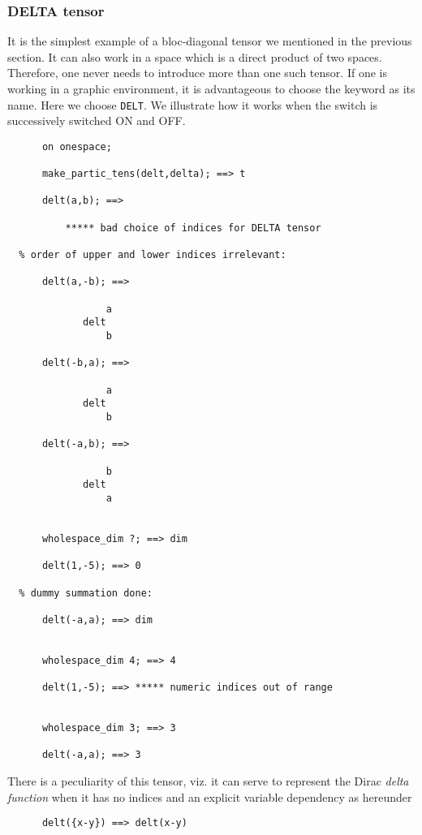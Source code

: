 \subsubsection{ DELTA tensor}
It is the simplest example of a bloc-diagonal
tensor we mentioned in the
previous section. It can also work in a space which is a direct product
of two spaces. Therefore, one never needs to introduce more than one 
such tensor. If one is working in a graphic environment, it is advantageous 
to choose the keyword as its name. Here we choose \texttt{DELT}.
We illustrate how it works  when the switch  is 
successively switched ON and OFF.
\begin{verbatim}
      on onespace;

      make_partic_tens(delt,delta); ==> t

      delt(a,b); ==> 

          ***** bad choice of indices for DELTA tensor

  % order of upper and lower indices irrelevant:    

      delt(a,-b); ==>

                 a
             delt
                 b

      delt(-b,a); ==>

                 a
             delt
                 b
     
      delt(-a,b); ==>

                 b
             delt
                 a


      wholespace_dim ?; ==> dim

      delt(1,-5); ==> 0

  % dummy summation done:   

      delt(-a,a); ==> dim


      wholespace_dim 4; ==> 4

      delt(1,-5); ==> ***** numeric indices out of range


      wholespace_dim 3; ==> 3

      delt(-a,a); ==> 3
\end{verbatim}
There is a peculiarity of this tensor, viz. it can serve to represent 
the Dirac \emph{delta function}
 when it has no indices and an explicit variable dependency as hereunder
\begin{verbatim}
      delt({x-y}) ==> delt(x-y)
\end{verbatim}
